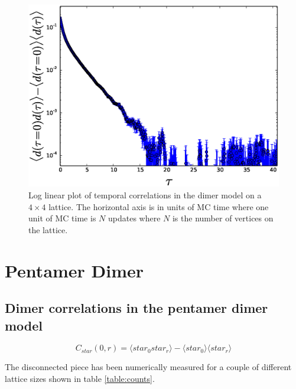 \documentclass[aps,floatfix,11pt]{revtex4-1}
\begin{document}
\begin{figure}[h]
    \centering
    \includegraphics[width=8.5 cm]{time_cor_dmr_dmr_model_dmr_dmr_log_MCtimeax_4x4}
    \caption{Log linear plot of temporal correlations in the dimer model on a $4\times 4$ lattice. The horizontal axis
    is in units of MC time where one unit of MC time is $N$ updates where $N$ is the number of
    vertices on the lattice. }
    \label{fig:time_cor_dmr_dmr_model_dmr_dmr_log_MCtimeax_4x4}
\end{figure}

\clearpage

\section{Pentamer Dimer}

\subsection{Dimer correlations in the pentamer dimer model}

\begin{equation}
    \label{}
    C_{star}(0,r) =  \langle star_0 star_r \rangle -\langle star_0 \rangle \langle star_r \rangle
\end{equation}

\noindent
The disconnected piece has been numerically measured for a couple of different lattice sizes shown
in table \ref{table:counts}.
\end{document}
